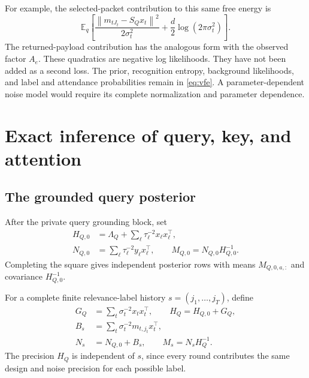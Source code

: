 \documentclass[11pt]{article}
\theoremstyle{definition}
\theoremstyle{remark}
\newcommand{\E}{\mathbb E}
\newcommand{\SQ}{S_{Q}}
\newcommand{\norm}[1]{\left\lVert #1\right\rVert}
\begin{document}
For example, the selected-packet contribution to this same free energy is
\[
\E_q\left[
\frac{\norm{m_{tJ_t}-\SQ x_t}^2}{2\sigma_t^2}
+\frac d2\log(2\pi\sigma_t^2)
\right].
\]
The returned-payload contribution has the analogous form with the observed factor \(A_e\). These quadratics are negative log likelihoods. They have not been added as a second loss. The prior, recognition entropy, background likelihoods, and label and attendance probabilities remain in \eqref{eq:vfe}. A parameter-dependent noise model would require its complete normalization and parameter dependence.

\section{Exact inference of query, key, and attention}

\subsection{The grounded query posterior}

After the private query grounding block, set
\begin{equation}
\begin{split}
H_{Q,0}&=\Lambda_Q+\sum_\ell\tau_\ell^{-2}x_\ell x_\ell^\top,\\
N_{Q,0}&=\sum_\ell\tau_\ell^{-2}y_\ell x_\ell^\top,\qquad
M_{Q,0}=N_{Q,0}H_{Q,0}^{-1}.
\end{split}
\label{eq:q-ground-stats}
\end{equation}
Completing the square gives independent posterior rows with means \(M_{Q,0,a,:}\) and covariance \(H_{Q,0}^{-1}\).

For a complete finite relevance-label history \(s=(j_1,\ldots,j_T)\), define
\begin{align}
G_Q&=\sum_t\sigma_t^{-2}x_tx_t^\top,\qquad H_Q=H_{Q,0}+G_Q,\nonumber\\
B_s&=\sum_t\sigma_t^{-2}m_{t,j_t}x_t^\top,\nonumber\\
N_s&=N_{Q,0}+B_s,\qquad M_s=N_sH_Q^{-1}.
\label{eq:q-label-stats}
\end{align}
The precision \(H_Q\) is independent of \(s\), since every round contributes the same design and noise precision for each possible label.
\end{document}

